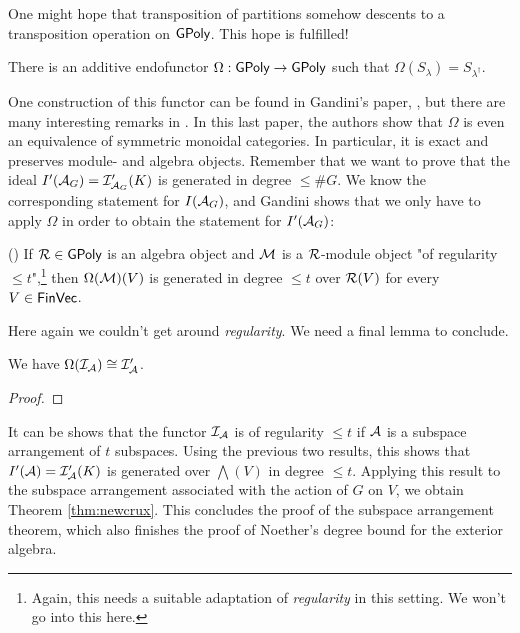 \documentclass[../main.tex]{subfiles}
\begin{document}
One might hope that transposition of partitions somehow descents to 
a transposition operation on $\textnormal{$\textsf{GPoly}$}$. This hope is fulfilled!
\begin{thm}[]
    There is an additive endofunctor $\Omega: \textnormal{$\textsf{GPoly}$} \to \textnormal{$\textsf{GPoly}$}$ such that 
    $\Omega(S_\lambda) = S_{\lambda^\dagger}$.
\end{thm}
One construction of this functor can be found in Gandini's paper,
\cite{Gandini2019ResOfIdeals}, but there are many interesting remarks in
\cite{sam2012introduction}. In this last paper, the authors show that $\Omega$
is even an equivalence of symmetric monoidal categories. In particular, 
it is exact and preserves module- and algebra objects. Remember that we want to
prove that the ideal $I'(\mathcal{A}_G) = \mathcal{I}'_{\mathcal{A}_G}(K)$ is generated in degree $\leq
\#G$. We know the corresponding statement for $I(\mathcal{A}_G)$, and Gandini shows
that we only have to apply $\Omega$ in order to obtain the statement for
$I'(\mathcal{A}_G)$:
\begin{prop}(\cite[Proposition 6.1]{Gandini2019ResOfIdeals})
    If $\mathcal{R} \in \textnormal{$\textsf{GPoly}$}$ is an algebra object and $\mathcal{M}$ is a $\mathcal{R}$-module object
    "of regularity $\leq t$",\footnote{Again, this needs a suitable adaptation of \emph{regularity} in this setting. We won't go into this here.} then $\Omega(\mathcal{M})(V)$ is generated in degree 
    $\leq t$ over $\mathcal{R}(V)$ for every $V \in \textnormal{$\textsf{FinVec}$}$. 
\end{prop}
Here again we couldn't get around \textit{regularity}. We need a final lemma to
conclude.
\begin{lem}
    We have $\Omega(\mathcal{I}_{\mathcal{A}}) \cong \mathcal{I}'_{\mathcal{A}}$.
\end{lem}
\begin{proof}
\end{proof}

It can be shows that the functor $\mathcal{I}_{\mathcal{A}}$ is of regularity $\leq t$ if
$\mathcal{A}$ is a subspace arrangement of $t$ subspaces. Using the previous two 
results, this shows that $I'(\mathcal{A}) = \mathcal{I}'_{\mathcal{A}}(K)$ is generated over $\bigwedge(V)$
in degree $\leq t$. Applying this result to the subspace arrangement 
associated with the action of $G$ on $V$, we obtain Theorem \ref{thm:newcrux}.
This concludes the proof of the subspace arrangement theorem, which also
finishes the proof of Noether's degree bound for the exterior algebra.
\end{document}
